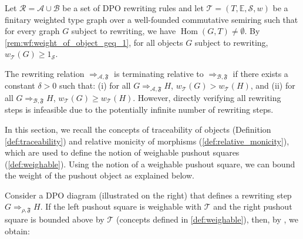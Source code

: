 Let \( \mathcal{R} = \mathcal{A} \cup \mathcal{B} \) be a set of DPO rewriting rules and let $\mathcal{T}=(T,\mathbb{E},\mathcal{S},w)$ be a finitary weighted type graph over a well-founded commutative semiring such that for every graph $G$ subject to rewriting, we have $\operatorname{Hom}(G,T)\neq \emptyset$. By \autoref{rem:wf:weight_of_object_geq_1}, for all objects \( G \) subject to rewriting, \(w_\mathcal{T}(G) \geq 1_\mathcal{S} \).

The rewriting relation \( \Rightarrow_{\mathcal{A},\mathfrak{F}} \) is terminating relative to $\Rightarrow_{\mathcal{B},\mathfrak{F}}$ if there exists a constant $\delta > 0$ such that: (i) for all \(G \Rightarrow_{\mathcal{A},\mathfrak{F}} H\), \( w_\mathcal{T}(G) > w_\mathcal{T}(H)\), and (ii) for all \(G \Rightarrow_{\mathcal{B},\mathfrak{F}} H\), \( w_\mathcal{T}(G) \geq w_\mathcal{T}(H) \). However, directly verifying all rewriting steps is infeasible due to the potentially infinite number of rewriting steps.

In this section, we recall the concepts of traceability of objects (Definition \ref{def:traceability}) and relative monicity of morphisms (\autoref{def:relative_monicity}), which are used to define the notion of weighable pushout squares (\autoref{def:weighable}). Using the notion of a weighable pushout square, we can bound the weight of the pushout object as explained below.

\noindent
\begin{minipage}{0.7\textwidth}\setlength{\parindent}{1em}
    Consider a DPO diagram (illustrated on the right) that defines a rewriting step \( G \Rightarrow_{\rho,\mathfrak{F}} H \). 
    If the left pushout square is weighable with $\mathcal{T}$ and the right pushout square is bounded above by $\mathcal{T}$ (concepts defined in \autoref{def:weighable}), then, by \cite[Lemma 4.13]{endrullis2024generalized_arxiv_v2}, we obtain:
\end{minipage}%
\hfill
\begin{minipage}{0.29\textwidth}
    \hfill
\end{minipage}

